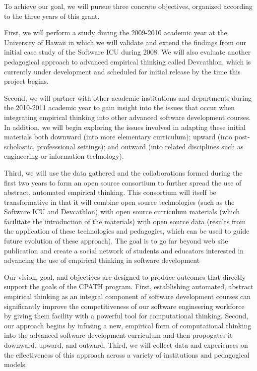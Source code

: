 To achieve our goal, we will pursue three concrete objectives, organized
according to the three years of this grant.  

First, we will perform a study during the 2009-2010 academic year at the
University of Hawaii in which we will validate and extend the findings from
our initial case study of the Software ICU during 2008.  We will also
evaluate another pedagogical approach to advanced empirical thinking called
Devcathlon, which is currently under development and scheduled for initial
release by the time this project begins.

Second, we will partner with other academic institutions and departments
during the 2010-2011 academic year to gain insight into the issues that
occur when integrating empirical thinking into other advanced software
development courses.  In addition, we will begin exploring the issues
involved in adapting these initial materials both downward (into more
elementary curriculum); upward (into post-scholastic, professsional
settings); and outward (into related disciplines such as engineering or
information technology).

Third, we will use the data gathered and the collaborations formed during
the first two years to form an open source consortium to further spread the
use of abstract, automated empirical thinking.  This consortium will itself
be transformative in that it will combine open source technologies (such as
the Software ICU and Devcathlon) with open source curriculum materials
(which facilitate the introduction of the materials) with open source data
(results from the application of these technologies and pedagogies, which
can be used to guide future evolution of these approach).  The goal is to go far beyond web site publication and create a social network of students and educators interested in advancing the use of empirical thinking in software development

Our vision, goal, and objectives are designed to produce outcomes that
directly support the goals of the CPATH program.  First, establishing
automated, abstract empirical thinking as an integral component of software
development courses can significantly improve the competitiveness of our
software engineering workforce by giving them facility with a powerful tool
for computational thinking.  Second, our approach begins by infusing a new,
empirical form of computational thinking into the advanced software
development curriculum and then propogates it downward, upward, and
outward.  Third, we will collect data and experiences on the effectiveness
of this approach across a variety of institutions and pedagogical models.

